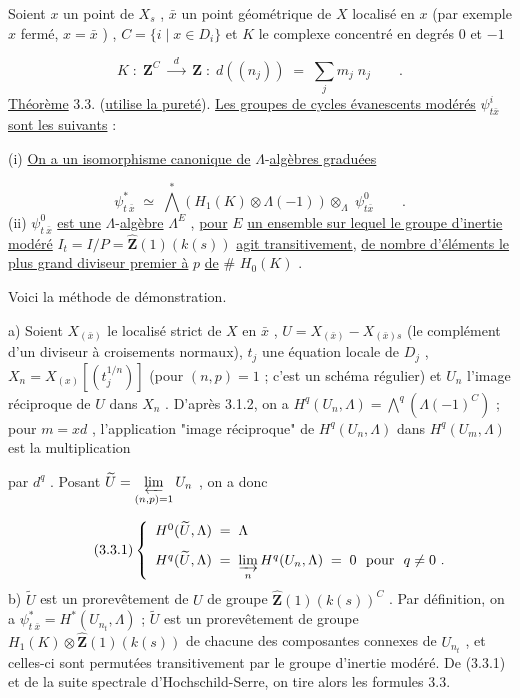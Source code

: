 Soient  $x$  un point de  $X_{s}$ , $\bar{x}$  un point géométrique de  $X$  localisé en  $x$  (par exemple  $x$  fermé,  $x = \bar{x}$ ) ,  $C = \{i \mid x \in D_{i}\}$  et  $K$  le complexe concentré en degrés  $0$  et  $-1$

\begin{equation*}
K \;:\; \mathbf{Z}^{C} \;\xrightarrow{\;\;d\;\;}\; \mathbf{Z} \;:\; d((n_{j})) \;=\; \sum\limits_{j} m_{j}\; n_{j} \qquad .
\end{equation*}
\underline{Théorème} 3.3. (\underline{utilise la pureté}). \underline{Les groupes de cycles évanescents modérés} $\psi^{i}_{t\bar{x}}$ \underline{sont les suivants} :

(i) \underline{On a un isomorphisme canonique de} $\Lambda$-\underline{algèbres graduées}

\begin{equation*}
\psi^{*}_{t\ \bar{x}} \;\simeq\; \overset{*}{\bigwedge}(H_{1}(K) \otimes \Lambda(-1)) \otimes_{\Lambda} \; \psi^{0}_{t\bar{x}} \qquad .
\end{equation*}
(ii) $\psi^{0}_{t\ \bar{x}}$ \underline{est une} $\Lambda$-\underline{algèbre} $\Lambda^{E}$ , \underline{pour} $E$ \underline{un ensemble sur lequel le groupe d'inertie modéré} $I_{t} = I/P = \hat{\mathbf{Z}}(1)(k(s))$ \underline{agit transitivement}, \underline{de nombre d'éléments le plus grand diviseur premier à} $p$ \underline{de} $\#$ $H_{0}(K)$ .

Voici la méthode de démonstration.

a) Soient  $X_{(\bar{x})}$  le localisé strict de  $X$  en  $\bar{x}$ , $U = X_{(\bar{x})} - X_{(\bar{x})s}$  (le complément d'un diviseur à croisements normaux), $t_{j}$  une équation locale de  $D_{j}$ , $X_{n} = X_{(x)}\left[(t_{j}^{1/n})\right]$ (pour  $(n,p) = 1$ ; c'est un schéma régulier) et  $U_{n}$  l'image réciproque de  $U$  dans  $X_{n}$ . D'après 3.1.2, on a  $H^{q}(U_{n},\Lambda) = \overset{q}{\bigwedge}(\Lambda(-1)^{C})$  ; pour  $m = x d$ , l'application "image réciproque" de  $H^{q}(U_{n},\Lambda)$  dans  $H^{q}(U_{m},\Lambda)$  est la multiplication



par  $d^{q}$ . Posant  $\widetilde{U} = \varprojlim\limits_{(n,p)=1} U_{n}$ , on a donc

\begin{equation}\tag{3.3.1}
\left\{\begin{array}{l} H^{0}(\widetilde{U},\Lambda) \;=\; \Lambda \\[8pt] H^{q}(\widetilde{U},\Lambda) \;=\; \varinjlim\limits_{n} H^{q}(U_{n},\Lambda) \;=\; 0 \ \ \text{pour}\ \ q \neq 0 \ . \end{array}\right.
\end{equation}
b) $\widetilde{U}$  est un prorevêtement de  $U$  de groupe  $\hat{\mathbf{Z}}(1)(k(s))^{C}$ . Par définition, on a  $\psi^{*}_{t\ \bar{x}} = H^{*}(U_{n_{t}} ,\Lambda)$ ; $\widetilde{U}$  est un prorevêtement de groupe  $H_{1}(K) \otimes \hat{\mathbf{Z}}(1)(k(s))$  de chacune des composantes connexes de  $U_{n_{t}}$ , et celles-ci sont permutées transitivement par le groupe d'inertie modéré. De (3.3.1) et de la suite spectrale d'Hochschild-Serre, on tire alors les formules 3.3.

